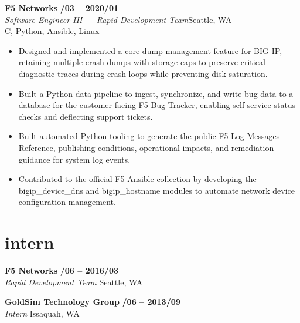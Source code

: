 \documentclass[margin,10pt]{res}
\begin{document}
\begin{resume}
    \href{https://www.f5.com/}{\textbf{F5 Networks}} \hfill \textsc{\bfseries{}/03 -- 2020/01}\\
    \textit{Software Engineer III --- Rapid Development Team}\hfill Seattle, WA\\
    C, Python, Ansible, Linux
    \begin{itemize}
        \item Designed and implemented a core dump management feature for BIG-IP, retaining multiple crash dumps with storage caps to preserve critical diagnostic traces during crash loops while preventing disk saturation.
        \item Built a Python data pipeline to ingest, synchronize, and write bug data to a database for the customer-facing F5 Bug Tracker, enabling self-service status checks and deflecting support tickets.
        \item Built automated Python tooling to generate the public F5 Log Messages Reference, publishing conditions, operational impacts, and remediation guidance for system log events.
        \item Contributed to the official F5 Ansible collection by developing the bigip\_device\_dns and bigip\_hostname modules to automate network device configuration management.
    \end{itemize}
\section{\sc \lsstyle intern}
    \textbf{F5 Networks} \hfill \textsc{\bfseries{}/06 -- 2016/03}\\
    \textit{Rapid Development Team} \hfill Seattle, WA

    \textbf{GoldSim Technology Group} \hfill \textsc{\bfseries{}/06 -- 2013/09}\\
    \textit{Intern} \hfill Issaquah, WA 


\end{resume}
\end{document}
